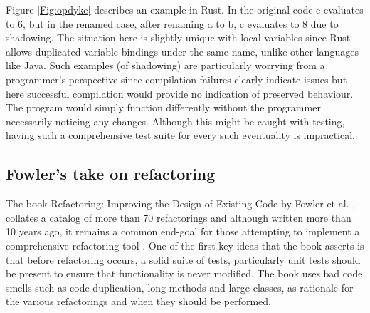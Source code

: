 \label{fig:listings}

Figure \ref{Fig:opdyke} describes an example in Rust. In the original code c evaluates to 6, but in the renamed case, after renaming a to b, c evaluates to 8 due to shadowing. The situation here is slightly unique with local variables since Rust allows duplicated variable bindings under the same name, unlike other languages like Java. Such examples (of shadowing) are particularly worrying from a programmer's perspective since compilation failures clearly indicate issues but here successful compilation would provide no indication of preserved behaviour. The program would simply function differently without the programmer necessarily noticing any changes. Although this might be caught with testing, having such a comprehensive test suite for every such eventuality is impractical.

\subsection{Fowler's take on refactoring}
The book Refactoring: Improving the Design of Existing Code by Fowler et al. \cite{fowler99}, collates a catalog of more than 70 refactorings and although written more than 10 years ago, it remains a common end-goal for those attempting to implement a comprehensive refactoring tool \cite{jetbrains15}. One of the first key ideas that the book asserts is that before refactoring occurs, a solid suite of tests, particularly unit tests should be present to ensure that functionality is never modified. The book uses bad code smells such as code duplication, long methods and large classes, as rationale for the various refactorings and when they should be performed. 

